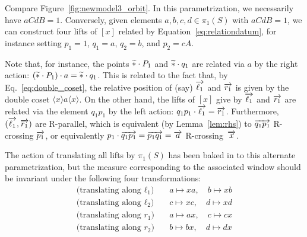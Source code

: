 \begin{figure}
\end{figure}

Compare Figure~\ref{fig:newmodel3_orbit}. In this parametrization, we necessarily have $aCdB = 1$.
Conversely, given elements $a,b,c,d \in \pi_1(S)$ with
$aCdB = 1$, we can
construct four lifts of $[x]$ related by Equation~\eqref{eq:relationdatum}, for instance
setting $p_1 = 1$, $q_1 = a$, $q_2 = b$, and $p_2 = cA$.

Note that, for instance, the points $\widetilde{\ast} \cdot P_1$ and $\widetilde{\ast}
\cdot q_1$ are related via $a$ by the right action: $(\widetilde{\ast} \cdot
P_1) \cdot a = \widetilde{\ast} \cdot q_1$. This is related to the fact that,
by Eq.~\eqref{eq:double_coset}, the relative position
of (say) $\overrightarrow{\ell_1}$ and $\overrightarrow{r_1}$ is given by the double coset
$\langle x \rangle a \langle x \rangle$.
On the other hand, the lifts of $[x]$ give by $\overrightarrow{\ell_1}$ and
$\overrightarrow{r_1}$ are related via the element $q_1 p_1$ by the left action:
$q_1 p_1 \cdot \overrightarrow{\ell_1} = \overrightarrow{r_1}$. Furthermore,
$(\overrightarrow{\ell_1},\overrightarrow{r_1})$ are R-parallel, which is equivalent (by
Lemma~\ref{lem:rhs}) to $\overrightarrow{q_1p_1}$ R-crossing $\overrightarrow{p_1}$, or
equivalently $p_1 \cdot \overrightarrow{q_1 p_1} = \overrightarrow{p_1 q_1} = \overrightarrow{a}$
R-crossing~$\overrightarrow{x}$.

The action of translating all lifts by $\pi_1(S)$ has been baked in to
this alternate parametrization,
but the measure corresponding to the associated window should be
invariant under the following four transformations:
\begin{subequations}\label{eq:translations}
\begin{align}
\text{(translating along $\ell_1$)} \quad & a \mapsto xa,\quad b \mapsto xb \label{eq:translations-l1}\\
\text{(translating along $\ell_2$)} \quad & c \mapsto xc,\quad d \mapsto xd \label{eq:translations-l2}\\
\text{(translating along $r_1$)} \quad & a \mapsto ax,\quad c \mapsto cx \label{eq:translations-r1}\\
\text{(translating along $r_2$)} \quad & b \mapsto bx,\quad d \mapsto dx \label{eq:translations-r2}
\end{align}
\end{subequations}



